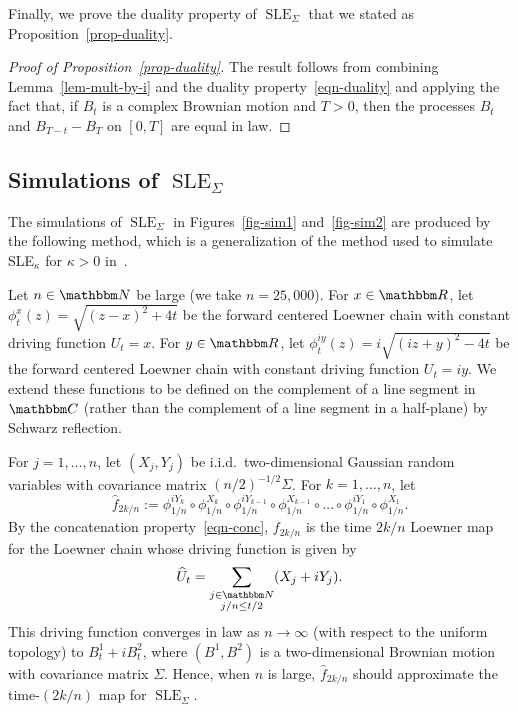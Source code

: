 \documentclass[11pt]{article}
\theoremstyle{plain}
\theoremstyle{definition}
\numberwithin{equation}{section}
\newcommand{\eqb}{\begin{equation}}
\newcommand{\eqe}{\end{equation}}
\newcommand{\BB}{\mathbbm}
\newcommand{\rta}{\rightarrow}
\newcommand{\wh}{\widehat}
\newcommand{\SLEG}{{\operatorname{SLE}}_\Sigma}
\begin{document}
 

Finally, we prove the duality property of $\SLEG$ that we stated as Proposition~\ref{prop-duality}.

\begin{proof}[Proof of Proposition~\ref{prop-duality}]
The result follows from combining Lemma~\ref{lem-mult-by-i} and the duality property~\eqref{eqn-duality} and applying the fact that, if $B_t$ is a complex Brownian motion and $T>0$, then the processes $B_t$ and $B_{T-t} - B_T$ on $[0,T]$ are equal in law.
\end{proof}







\subsection{Simulations of $\SLEG$}
\label{sec-sim}

The simulations of $\SLEG$ in Figures~\ref{fig-sim1} and~\ref{fig-sim2} are produced by the following method, which is a generalization of the method used to simulate SLE$_\kappa$ for $\kappa > 0$ in~\cite{kennedy-sle-sim}.

Let $n\in\BB N$ be large (we take $n = 25,000$). 
For $x \in \BB R$, let $\phi_t^x(z) = \sqrt{(z-x)^2  +4 t}$ be the forward centered Loewner chain with constant driving function $U_t =x$. For $y\in \BB R$, let $\phi_t^{i y}(z) = i \sqrt{( i z +  y)^2 - 4t}$ be the forward centered Loewner chain with constant driving function $U_t = i y$. We extend these functions to be defined on the complement of a line segment in $\BB C$ (rather than the complement of a line segment in a half-plane) by Schwarz reflection.
  
For $j = 1,\dots, n $, let $(X_j , Y_j)$ be i.i.d.\ two-dimensional Gaussian random variables with covariance matrix $ (n/2)^{-1/2} \Sigma$.  
For $k=1,\dots,n$, let
\eqb \label{eqn-sim-map}
\wh f_{2k / n} := \phi_{1/n}^{i Y_k} \circ \phi_{1/n}^{ X_k} \circ \phi_{1/n}^{ i Y_{k-1} } \circ \phi_{1/n}^{ X_{k-1}} \circ \dots \circ \phi_{1/n}^{ i Y_1} \circ \phi_{1/n}^{X_1}. 
\eqe
By the concatenation property~\eqref{eqn-conc}, $f_{2k / n}$ is the time $2 k / n$ Loewner map for the Loewner chain whose driving function is given by
\eqb \label{eqn-sim-driving}
\wh U_t = \sum_{\substack{j \in \BB N \\ j / n \leq t/2}} (X_j + i Y_j) .
\eqe  
This driving function converges in law as $n\rta\infty$ (with respect to the uniform topology) to $B_t^1 + i B_t^2$, where $(B^1,B^2)$ is a two-dimensional Brownian motion with covariance matrix $\Sigma$. Hence, when $n$ is large, $\wh f_{2k / n}$ should approximate the time-$(2k/n)$ map for $\SLEG$. 
\end{document}
